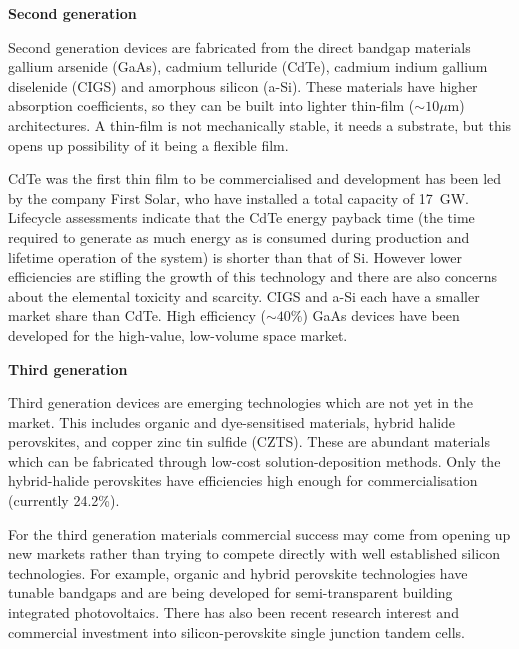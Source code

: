 \newline
\textbf{Second generation}\newline

Second generation devices are fabricated from the direct bandgap materials gallium arsenide (GaAs), cadmium telluride (CdTe), cadmium indium gallium diselenide (CIGS) and amorphous silicon (a-Si). These materials have higher absorption coefficients, so they can be built into lighter thin-film ($\sim 10\mu \textrm{m}$) architectures. A thin-film is not mechanically stable, it needs a substrate, but this opens up possibility of it being a flexible film.

CdTe was the first thin film to be commercialised and development has been led by the company First Solar, who have installed a total capacity of \SI{17}{\giga\watt}. Lifecycle assessments indicate that the CdTe energy payback time (the time required to generate as much energy as is consumed during production and lifetime operation of the system) is shorter than that of Si.\autocite{Koppelaar2017} However lower efficiencies are stifling the growth of this technology and there are also concerns about the elemental toxicity and scarcity. CIGS and a-Si each have a smaller market share than CdTe. High efficiency ($\sim 40\%$) GaAs devices have been developed for the high-value, low-volume space market.

\newline
\textbf{Third generation}\newline

Third generation devices are emerging technologies which are not yet in the market. This includes organic and dye-sensitised materials, hybrid halide perovskites, and copper zinc tin sulfide (CZTS). These are abundant materials which can be fabricated through low-cost solution-deposition methods. Only the hybrid-halide perovskites have efficiencies high enough for commercialisation (currently 24.2\%).

For the third generation materials commercial success may come from opening up new markets rather than trying to compete directly with well established silicon technologies. For example, organic and hybrid perovskite technologies have tunable bandgaps and are being developed for semi-transparent building integrated photovoltaics.
There has also been recent research interest and commercial investment into silicon-perovskite single junction tandem cells.

